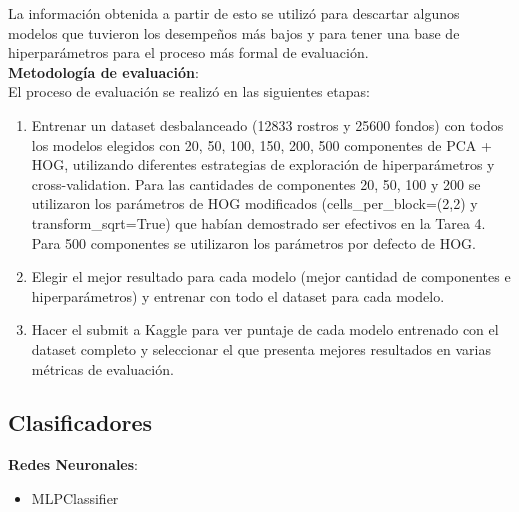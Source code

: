 \documentclass{article}
\begin{document}
La información obtenida a partir de esto se utilizó para descartar algunos modelos que tuvieron los desempeños más bajos y para tener una base de hiperparámetros para el proceso más formal de evaluación.\\

\textbf{Metodología de evaluación}:\\

El proceso de evaluación se realizó en las siguientes etapas:

\begin{enumerate}
    \item Entrenar un dataset desbalanceado (12833 rostros y 25600 fondos) con todos los modelos elegidos con 20, 50, 100, 150, 200, 500 componentes de PCA + HOG, utilizando diferentes estrategias de exploración de hiperparámetros y cross-validation. Para las cantidades de componentes 20, 50, 100 y 200 se utilizaron los parámetros de HOG modificados (cells\_per\_block=(2,2) y transform\_sqrt=True) que habían demostrado ser efectivos en la Tarea 4. Para 500 componentes se utilizaron los parámetros por defecto de HOG.
    \item Elegir el mejor resultado para cada modelo (mejor cantidad de componentes e hiperparámetros) y entrenar con todo el dataset para cada modelo.
    \item Hacer el submit a Kaggle para ver puntaje de cada modelo entrenado con el dataset completo y seleccionar el que presenta mejores resultados en varias métricas de evaluación.
\end{enumerate}
\subsection*{Clasificadores}

\textbf{Redes Neuronales}:
\begin{itemize}
    \item MLPClassifier
\end{itemize}
\end{document}
